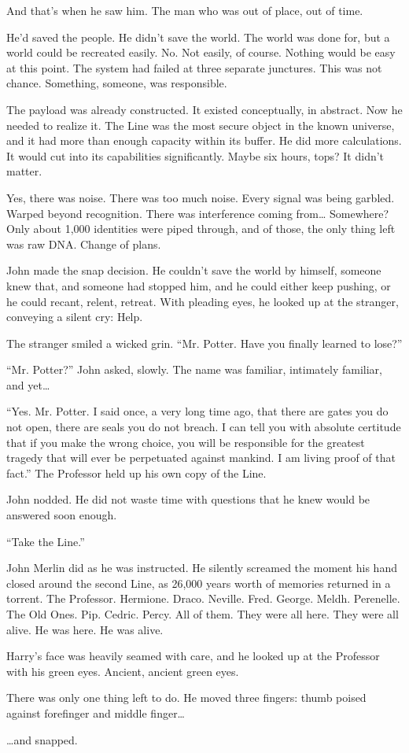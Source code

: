 And that’s when he saw him. The man who was out of place, out of time.

He’d saved the people. He didn’t save the world. The world was done for, but a world could be recreated easily. No. Not easily, of course. Nothing would be easy at this point. The system had failed at three separate junctures. This was not chance. Something, someone, was responsible.

The payload was already constructed. It existed conceptually, in abstract. Now he needed to realize it. The Line was the most secure object in the known universe, and it had more than enough capacity within its buffer. He did more calculations. It would cut into its capabilities significantly. Maybe six hours, tops? It didn’t matter.

Yes, there was noise. There was too much noise. Every signal was being garbled. Warped beyond recognition. There was interference coming from… Somewhere? Only about 1,000 identities were piped through, and of those, the only thing left was raw DNA.  Change of plans.

John made the snap decision. He couldn’t save the world by himself, someone knew that, and someone had stopped him, and he could either keep pushing,  or he could recant, relent, retreat. With pleading eyes, he looked up at the stranger, conveying a silent cry: Help.

The stranger smiled a wicked grin. “Mr. Potter. Have you finally learned to lose?”

“Mr. Potter?” John asked, slowly. The name was familiar, intimately familiar, and yet…

“Yes. Mr. Potter. I said once, a very long time ago, that there are gates you do not open, there are seals you do not breach. I can tell you with absolute certitude that if you make the wrong choice, you will be responsible for the greatest tragedy that will ever be perpetuated against mankind. I am living proof of that fact.” The Professor held up his own copy of the Line.

John nodded. He did not waste time with questions that he knew would be answered soon enough.

“Take the Line.”

John Merlin did as he was instructed. He silently screamed the moment his hand closed around the second Line, as 26,000 years worth of memories returned in a torrent. The Professor. Hermione. Draco. Neville. Fred. George. Meldh. Perenelle. The Old Ones. Pip. Cedric. Percy. All of them. They were all here. They were all alive. He was here. He was alive.

Harry’s face was heavily seamed with care, and he looked up at the Professor with his green eyes.  Ancient, ancient green eyes.

There was only one thing left to do. He moved three fingers: thumb poised against forefinger and middle finger…

…and snapped.
